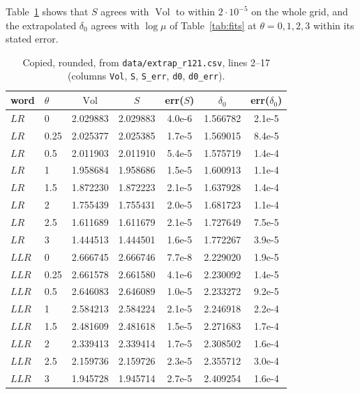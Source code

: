\documentclass[11pt]{amsart}
\theoremstyle{definition}
\theoremstyle{remark}
\newcommand{\Vol}{\operatorname{Vol}}
\begin{document}
Table~\ref{tab:grid} shows that $S$ agrees with $\Vol$ to within
$2\cdot10^{-5}$ on the whole grid, and the extrapolated $\delta_0$ agrees with
$\log\mu$ of Table~\ref{tab:fits} at $\theta = 0,1,2,3$ within its stated error.

\begin{table}[ht]
\centering
\begin{tabular}{llccccc}
\toprule
word & $\theta$ & $\Vol$ & $S$ & err($S$) & $\delta_0$ & err($\delta_0$) \\
\midrule
$LR$  & 0    & 2.029883 & 2.029883 & 4.0e-6 & 1.566782 & 2.1e-5 \\
$LR$  & 0.25 & 2.025377 & 2.025385 & 1.7e-5 & 1.569015 & 8.4e-5 \\
$LR$  & 0.5  & 2.011903 & 2.011910 & 5.4e-5 & 1.575719 & 1.4e-4 \\
$LR$  & 1    & 1.958684 & 1.958686 & 1.5e-5 & 1.600913 & 1.1e-4 \\
$LR$  & 1.5  & 1.872230 & 1.872223 & 2.1e-5 & 1.637928 & 1.4e-4 \\
$LR$  & 2    & 1.755439 & 1.755431 & 2.0e-5 & 1.681723 & 1.1e-4 \\
$LR$  & 2.5  & 1.611689 & 1.611679 & 2.1e-5 & 1.727649 & 7.5e-5 \\
$LR$  & 3    & 1.444513 & 1.444501 & 1.6e-5 & 1.772267 & 3.9e-5 \\
$LLR$ & 0    & 2.666745 & 2.666746 & 7.7e-8 & 2.229020 & 1.9e-5 \\
$LLR$ & 0.25 & 2.661578 & 2.661580 & 4.1e-6 & 2.230092 & 1.4e-5 \\
$LLR$ & 0.5  & 2.646083 & 2.646089 & 1.0e-5 & 2.233272 & 9.2e-5 \\
$LLR$ & 1    & 2.584213 & 2.584224 & 2.1e-5 & 2.246918 & 2.2e-4 \\
$LLR$ & 1.5  & 2.481609 & 2.481618 & 1.5e-5 & 2.271683 & 1.7e-4 \\
$LLR$ & 2    & 2.339413 & 2.339414 & 1.7e-5 & 2.308502 & 1.6e-4 \\
$LLR$ & 2.5  & 2.159736 & 2.159726 & 2.3e-5 & 2.355712 & 3.0e-4 \\
$LLR$ & 3    & 1.945728 & 1.945714 & 2.7e-5 & 2.409254 & 1.6e-4 \\
\bottomrule
\end{tabular}
\caption{Copied, rounded, from \texttt{data/extrap\_r121.csv}, lines 2--17
(columns \texttt{Vol}, \texttt{S}, \texttt{S\_err}, \texttt{d0}, \texttt{d0\_err}).}
\label{tab:grid}
\end{table}
\end{document}
